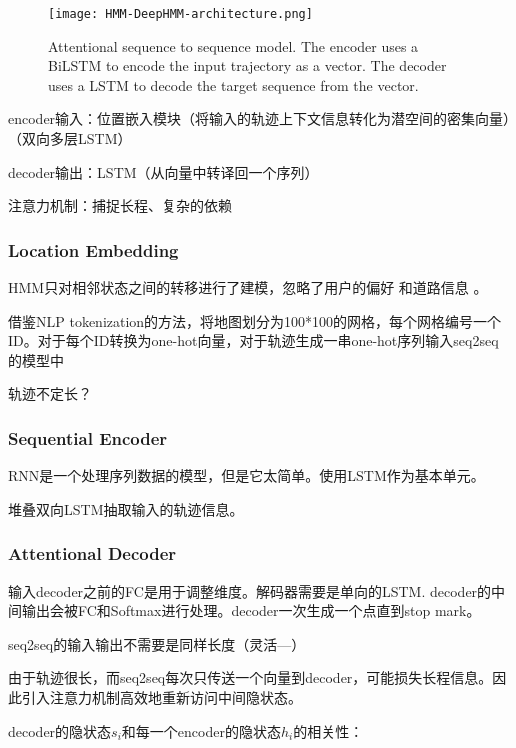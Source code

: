 \begin{figure}[htbp]
    \caption{Attentional sequence to sequence model. The encoder uses a
    BiLSTM to encode the input trajectory as a vector. The decoder uses a
    LSTM to decode the target sequence from the vector.}
    \centering
    \texttt{[image: HMM-DeepHMM-architecture.png]}
\end{figure}

encoder输入：位置嵌入模块（将输入的轨迹上下文信息转化为潜空间的密集向量）（双向多层LSTM）

decoder输出：LSTM（从向量中转译回一个序列）

注意力机制：捕捉长程、复杂的依赖

\subsubsection{Location Embedding}

HMM只对相邻状态之间的转移进行了建模，忽略了用户的偏好 \cite{Jagadeesh2017} 和道路信息 \cite{Hu2017a}。

借鉴NLP tokenization的方法，将地图划分为100*100的网格，每个网格编号一个ID。对于每个ID转换为one-hot向量，对于轨迹生成一串one-hot序列输入seq2seq的模型中

\begin{remark}
    轨迹不定长？
\end{remark}

\subsubsection{Sequential Encoder}

RNN是一个处理序列数据的模型，但是它太简单。使用LSTM作为基本单元。

堆叠双向LSTM抽取输入的轨迹信息。

\subsubsection{Attentional Decoder}

输入decoder之前的FC是用于调整维度。解码器需要是单向的LSTM. decoder的中间输出会被FC和Softmax进行处理。decoder一次生成一个点直到stop mark。

seq2seq的输入输出不需要是同样长度（灵活—）

由于轨迹很长，而seq2seq每次只传送一个向量到decoder，可能损失长程信息。因此引入注意力机制高效地重新访问中间隐状态。

decoder的隐状态$s_i$和每一个encoder的隐状态$h_i$的相关性：

